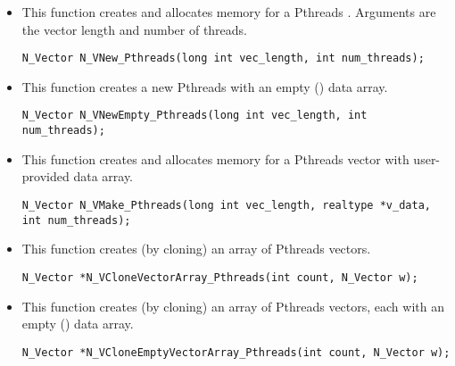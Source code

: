 \begin{itemize}


\item {}

  This function creates and allocates memory for a Pthreads .
  Arguments are the vector length and number of threads.

  

  \verb|N_Vector N_VNew_Pthreads(long int vec_length, int num_threads);|


\item {}

  This function creates a new Pthreads  with an empty () data array.

  

  \verb|N_Vector N_VNewEmpty_Pthreads(long int vec_length, int num_threads);|


\item {}

 This function creates and allocates memory for a Pthreads vector
 with user-provided data array.

 

 \verb|N_Vector N_VMake_Pthreads(long int vec_length, realtype *v_data, int num_threads);|


\item {}

 This function creates (by cloning) an array of  Pthreads vectors.

 

 \verb|N_Vector *N_VCloneVectorArray_Pthreads(int count, N_Vector w);|


\item {}

 This function creates (by cloning) an array of  Pthreads vectors, each with an
 empty () data array.

 

 \verb|N_Vector *N_VCloneEmptyVectorArray_Pthreads(int count, N_Vector w);|


\end{itemize}
